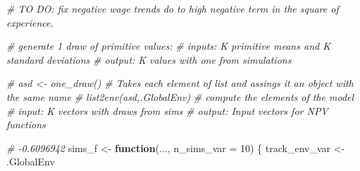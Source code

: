 \documentclass[]{article}
\newenvironment{Shaded}{\begin{snugshade}}{\end{snugshade}}
\newcommand{\CommentTok}[1]{\textcolor[rgb]{0.56,0.35,0.01}{\textit{#1}}}
\newcommand{\ControlFlowTok}[1]{\textcolor[rgb]{0.13,0.29,0.53}{\textbf{#1}}}
\newcommand{\DataTypeTok}[1]{\textcolor[rgb]{0.13,0.29,0.53}{#1}}
\newcommand{\DecValTok}[1]{\textcolor[rgb]{0.00,0.00,0.81}{#1}}
\newcommand{\NormalTok}[1]{#1}
\newcommand{\StringTok}[1]{\textcolor[rgb]{0.31,0.60,0.02}{#1}}
\begin{document}
\begin{Shaded}
\begin{Highlighting}[]
\CommentTok{# TO DO: fix negative wage trends do to high negative term in the square of experience. }

\CommentTok{#  generate 1 draw of primitive values:}
\CommentTok{#  inputs: K primitive means and K standard deviations}
\CommentTok{#  output: K values with one from simulations}

\CommentTok{# asd <- one_draw()}
\CommentTok{# Takes each element of list and assings it an object with the same name}
\CommentTok{# list2env(asd,.GlobalEnv)}
\CommentTok{# compute the elements of the model}
\CommentTok{#  input: K vectors with draws from sims}
\CommentTok{#  output: Input vectors for NPV functions}
\end{Highlighting}
\end{Shaded}

\begin{Shaded}
\begin{Highlighting}[]
\CommentTok{# -0.6096942}
\NormalTok{sims_f <-}\StringTok{ }\ControlFlowTok{function}\NormalTok{(..., }\DataTypeTok{n_sims_var =} \DecValTok{10}\NormalTok{) \{}
\NormalTok{track_env_var <-}\StringTok{ }\NormalTok{.GlobalEnv}


\end{Highlighting}
\end{Shaded}
\end{document}
